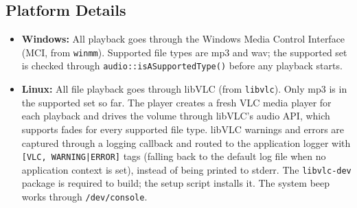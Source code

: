 \subsection{Platform Details}

\begin{itemize}\itemsep0em
	\item \textbf{Windows:} All playback goes through the Windows Media Control Interface (MCI, from \texttt{winmm}). Supported file types are mp3 and wav; the supported set is checked through \texttt{audio::isASupportedType()} before any playback starts.
	\item \textbf{Linux:} All file playback goes through libVLC (from \texttt{libvlc}). Only mp3 is in the supported set so far. The player creates a fresh VLC media player for each playback and drives the volume through libVLC's audio API, which supports fades for every supported file type. libVLC warnings and errors are captured through a logging callback and routed to the application logger with \texttt{[VLC, WARNING|ERROR]} tags (falling back to the default log file when no application context is set), instead of being printed to stderr. The \texttt{libvlc-dev} package is required to build; the setup script installs it. The system beep works through \texttt{/dev/console}.
\end{itemize}
